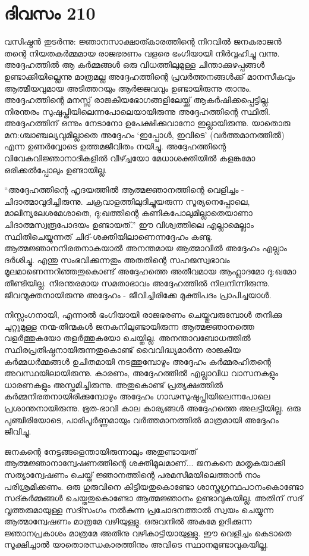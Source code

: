 \section{ദിവസം 210}


വസിഷ്ഠൻ തുടർന്നു: ജ്ഞാനസാക്ഷാത്കാരത്തിന്റെ നിറവിൽ ജനകരാജൻ തന്റെ  നിയതകര്‍മ്മമായ  രാജഭരണം വളരെ ഭംഗിയായി നിർവ്വഹിച്ചു വന്നു. അദ്ദേഹത്തിൽ ആ കർമ്മങ്ങൾ ഒരു വിധത്തിലുമുള്ള  ചിന്താക്കുഴപ്പങ്ങള്‍ ഉണ്ടാക്കിയില്ലെന്നു മാത്രമല്ല അദ്ദേഹത്തിന്റെ പ്രവർത്തനങ്ങൾക്ക് മാനസീകവും ആത്മീയവുമായ അടിത്തറയും ആർജ്ജവവും ഉണ്ടായിരുന്നു താനും. അദ്ദേഹത്തിന്റെ മനസ്സ് രാജകീയഭോഗങ്ങളിലേയ്ക്ക് ആകർഷിക്കപ്പെട്ടില്ല. നിരന്തരം സുഷുപ്തിയിലെന്നപോലെയായിരുന്നു അദ്ദേഹത്തിന്റെ സ്ഥിതി. അദ്ദേഹത്തിന്‌ ഒന്നും നേടാനോ ഉപേക്ഷിക്കുവാനോ ഇല്ലായിരുന്നു. യാതൊരു മന:ശ്ചാഞ്ചല്യവുമില്ലാതെ അദ്ദേഹം ‘ഇപ്പോൾ, ഇവിടെ’ (വർത്തമാനത്തിൽ) എന്ന ഉണർവ്വോടെ ഉത്തമജീവിതം നയിച്ചു. അദ്ദേഹത്തിന്റെ വിവേകവിജ്ഞാനാദികളിൽ വീഴ്ച്ചയോ മേധാശക്തിയിൽ  കളങ്കമോ ഒരിക്കല്‍പ്പോലും  ഉണ്ടായില്ല.

“അദ്ദേഹത്തിന്റെ ഹൃദയത്തിൽ ആത്മജ്ഞാനത്തിന്റെ വെളിച്ചം - ചിദാത്മാവുദിച്ചിരുന്നു. ചക്രവാളത്തിലുദിച്ചുയരുന്ന സൂര്യനെപ്പോലെ, മാലിന്യലേശമേശാതെ, ദു:ഖത്തിന്റെ കണികപോലുമില്ലാതെയാണാ ചിദാത്മസ്വരൂപോദയം ഉണ്ടായത്.” ഈ വിശ്വത്തിലെ എല്ലാമെല്ലാം സ്ഥിതിചെയ്യുന്നത് ചിദ്-ശക്തിയിലാണെന്നദ്ദേഹം കണ്ടു. ആത്മജ്ഞാനനിരതനാകയാൽ അനന്തമായ ആത്മാവിൽ അദ്ദേഹം എല്ലാം ദർശിച്ചു. എന്തു സംഭവിക്കുന്നതും അതതിന്റെ സഹജസ്വഭാവം മൂലമാണെന്നറിഞ്ഞതുകൊണ്ട് അദ്ദേഹത്തെ അതീവമായ ആഹ്ലാദമോ ദു:ഖമോ തീണ്ടിയില്ല. നിരന്തരമായ സമതാഭാവം അദ്ദേഹത്തിൽ നിലനിന്നിരുന്നു. ജീവന്മുക്തനായിരുന്നു അദ്ദേഹം - ജീവിച്ചിരിക്കേ മുക്തിപദം പ്രാപിച്ചയാൾ.

നിസ്സംഗനായി, എന്നാൽ ഭംഗിയായി രാജഭരണം ചെയ്തുവരുമ്പോൾ തനിക്കു ചുറ്റുമുള്ള നന്മ-തിന്മകൾ ജനകനിലുണ്ടായിരുന്ന ആത്മജ്ഞാനത്തെ വളർത്തുകയോ തളർത്തുകയോ ചെയ്തില്ല. അനന്താവബോധത്തിൽ സ്ഥിരപ്രതിഷ്ഠനായിരുന്നതുകൊണ്ട് വൈവിദ്ധ്യമാർന്ന രാജകീയ കർമ്മധർമ്മങ്ങൾ ഉചിതമായി നടത്തുമ്പോഴും അദ്ദേഹം കർമ്മരഹിതന്റെ അവസ്ഥയിലായിരുന്നു. കാരണം, അദ്ദേഹത്തിൽ എല്ലാവിധ വാസനകളും ധാരണകളും അസ്തമിച്ചിരുന്നു. അതുകൊണ്ട് പ്രത്യക്ഷത്തിൽ കർമ്മനിരതനായിരിക്കുമ്പോഴും അദ്ദേഹം ഗാഢസുഷുപ്തിയിലെന്നപോലെ  പ്രശാന്തനായിരുന്നു. ഭൂത-ഭാവി കാല കാര്യങ്ങൾ അദ്ദേഹത്തെ അലട്ടിയില്ല. ഒരു പുഞ്ചിരിയോടെ, പാരിപൂർണ്ണമായും വർത്തമാനത്തിൽ മാത്രമായി അദ്ദേഹം ജീവിച്ചു.

ജനകന്റെ നേട്ടങ്ങളെന്തായിരുന്നാലും അതുണ്ടായത് ആത്മജ്ഞാനാന്വേഷണത്തിന്റെ ശക്തിമൂലമാണ്‌... ജനകനെ മാതൃകയാക്കി സത്യാന്വേഷണം ചെയ്ത് ജ്ഞാനത്തിന്റെ പരമസീമയിലെത്താൻ നാം പരിശ്രമിക്കണം. ഒരു ഗുരുവിനെ കിട്ടിയതുകൊണ്ടോ ശാസ്ത്രഗ്രന്ഥപഠനംകൊണ്ടോ സദ്കർമ്മങ്ങൾ ചെയ്തതുകൊണ്ടോ ആത്മജ്ഞാനം ഉണ്ടാവുകയില്ല. അതിന്‌ സദ് വൃത്തരുമായുള്ള സദ്സംഗം നല്‍കുന്ന പ്രചോദനത്താല്‍  സ്വയം ചെയ്യുന്ന ആത്മാന്വേഷണം മാത്രമേ വഴിയുള്ളു. ഒരുവനില്‍ അകമേ ഉദിക്കുന്ന ജ്ഞാനപ്രകാശം മാത്രമേ അതിനു വഴികാട്ടിയായുള്ളു. ഈ വെളിച്ചം കെടാതെ സൂക്ഷിച്ചാൽ യാതൊരന്ധകാരത്തിനും അവിടെ സ്ഥാനമുണ്ടാവുകയില്ല. 
